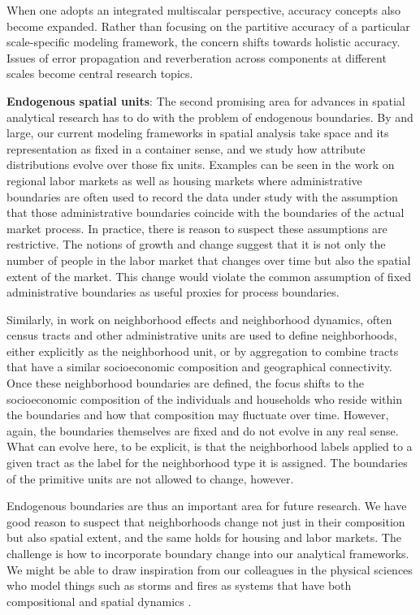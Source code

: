 \documentclass[11pt]{article}
\begin{document}
When one adopts an integrated multiscalar perspective, accuracy concepts also
become expanded. Rather than focusing on the partitive accuracy of a particular
scale-specific modeling framework, the concern shifts towards holistic accuracy.
Issues of error propagation and reverberation across components at different
scales become central research topics.


\textbf{Endogenous spatial units}: The second promising area for advances in spatial
analytical research has to do with the problem of endogenous boundaries. By and
large, our current modeling frameworks in spatial analysis take space and its
representation as fixed in a container sense, and we study how attribute
distributions evolve over those fix units. Examples can be seen in the work on
regional labor markets as well as housing markets where administrative
boundaries are often used to record the data under study with the assumption
that those administrative boundaries coincide with the boundaries of the actual
market process. In practice, there is reason to suspect these assumptions are
restrictive. The notions of growth and change suggest that it is not only the
number of people in the labor market that changes over time but also the spatial
extent of the market. This change would violate the common assumption of fixed
administrative boundaries as useful proxies for process boundaries.

Similarly, in work on neighborhood effects and neighborhood dynamics, often
census tracts and other administrative units are used to define neighborhoods,
either explicitly as the neighborhood unit, or by aggregation to combine tracts
that have a similar socioeconomic composition and geographical connectivity.
Once these neighborhood boundaries are defined, the focus shifts to the
socioeconomic composition of the individuals and households who reside within
the boundaries and how that composition may fluctuate over time. However, again, the
boundaries themselves are fixed and do not evolve in any real sense. What can
evolve here, to be explicit, is that the neighborhood labels applied to a
given tract as the label for the neighborhood type it is assigned. The
boundaries of the primitive units are not allowed to change, however.

Endogenous boundaries are thus an important area for future research. We have
good reason to suspect that neighborhoods change not just in their composition
but also spatial extent, and the same holds for housing and labor markets. The
challenge is how to incorporate boundary change into our analytical frameworks.
We might be able to draw inspiration from our colleagues in the physical
sciences who model things such as storms and fires as systems that have both
compositional and spatial dynamics \cite{yuan2001representing}.
\end{document}
